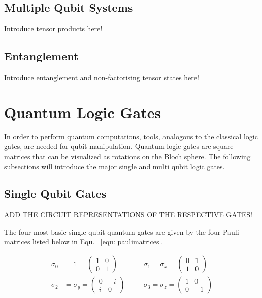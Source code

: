 
\subsection{Multiple Qubit Systems}
\label{subsec:multiplequbitsystems}

Introduce tensor products here!

\subsection{Entanglement}
\label{subsec:entanglement}

Introduce entanglement and non-factorising tensor states here!



\section{Quantum Logic Gates}
\label{subsec:quantumlogicgates}
In order to perform quantum computations, tools, analogous to the classical logic gates, are needed for qubit manipulation. Quantum logic gates are square matrices that can be visualized as rotations on the Bloch sphere. The following subsections will introduce the major single and multi qubit logic gates.

\subsection{Single Qubit Gates}
\label{subsubsec:singlequbitgates}

ADD THE CIRCUIT REPRESENTATIONS OF THE RESPECTIVE GATES!

The four most basic single-qubit quantum gates are given by the four Pauli matrices listed below in Equ. ~\ref{equ: paulimatrices}.

\begin{align}
\label{equ: paulimatrices}
\sigma_{0} &= \mathbb{1} = \begin{pmatrix}
 1 & 0 \\ 
 0 & 1
 \end{pmatrix}
 \quad
 &&\sigma_{1} = \sigma_{x} = \begin{pmatrix}
 0 & 1 \\ 
 1 & 0
 \end{pmatrix}
 \nonumber
 \\
 \sigma_{2} &= \sigma_{y} = \begin{pmatrix}
 0 & -i \\ 
 i & 0
 \end{pmatrix}
 \quad
 &&\sigma_{3} = \sigma_{z} = \begin{pmatrix}
 1 & 0 \\ 
 0 & -1
 \end{pmatrix}
\end{align}

